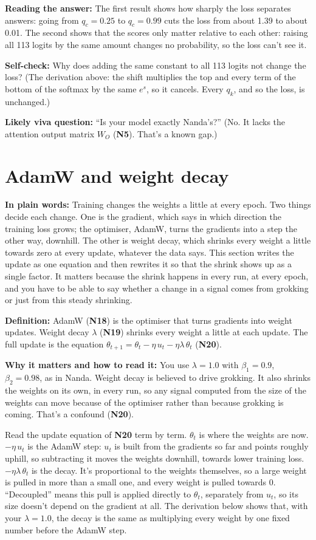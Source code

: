 \documentclass[11pt,a4paper,oneside,openany]{report}
\newcommand{\gl}[1]{\textbf{#1}}   %
\newcommand{\fplain}{\textbf{In plain words:} }
\newcommand{\fdef}{\textbf{Definition:} }
\newcommand{\fread}{\par\textbf{Why it matters and how to read it:} }
\newcommand{\fans}{\par\textbf{Reading the answer:} }
\newcommand{\fself}{\par\textbf{Self-check:} }
\newcommand{\fviva}{\par\textbf{Likely viva question:} }
\begin{document}
\fans The first result shows how sharply the loss separates answers: going from $q_c = 0.25$ to $q_c = 0.99$ cuts the loss from about 1.39 to about 0.01. The second shows that the scores only matter relative to each other: raising all 113 logits by the same amount changes no probability, so the loss can't see it.

\fself Why does adding the same constant to all 113 logits not change the loss? (The derivation above: the shift multiplies the top and every term of the bottom of the softmax by the same $e^s$, so it cancels. Every $q_k$, and so the loss, is unchanged.)
\fviva ``Is your model exactly Nanda's?'' (No. It lacks the attention output matrix $W_O$ (\gl{N5}). That's a known gap.)

\section{AdamW and weight decay}
\fplain Training changes the weights a little at every epoch. Two things decide each change. One is the gradient, which says in which direction the training loss grows; the optimiser, AdamW, turns the gradients into a step the other way, downhill. The other is weight decay, which shrinks every weight a little towards zero at every update, whatever the data says. This section writes the update as one equation and then rewrites it so that the shrink shows up as a single factor. It matters because the shrink happens in every run, at every epoch, and you have to be able to say whether a change in a signal comes from grokking or just from this steady shrinking.

\fdef AdamW (\gl{N18}) is the optimiser that turns gradients into weight updates. Weight decay $\lambda$ (\gl{N19}) shrinks every weight a little at each update. The full update is the equation $\theta_{t+1} = \theta_t - \eta\, u_t - \eta\lambda\, \theta_t$ (\gl{N20}).
\fread You use $\lambda = 1.0$ with $\beta_1 = 0.9$, $\beta_2 = 0.98$, as in Nanda. Weight decay is believed to drive grokking. It also shrinks the weights on its own, in every run, so any signal computed from the size of the weights can move because of the optimiser rather than because grokking is coming. That's a confound (\gl{N20}).

Read the update equation of \gl{N20} term by term. $\theta_t$ is where the weights are now. $-\eta\, u_t$ is the AdamW step: $u_t$ is built from the gradients so far and points roughly uphill, so subtracting it moves the weights downhill, towards lower training loss. $-\eta\lambda\, \theta_t$ is the decay. It's proportional to the weights themselves, so a large weight is pulled in more than a small one, and every weight is pulled towards 0. ``Decoupled'' means this pull is applied directly to $\theta_t$, separately from $u_t$, so its size doesn't depend on the gradient at all. The derivation below shows that, with your $\lambda = 1.0$, the decay is the same as multiplying every weight by one fixed number before the AdamW step.
\end{document}
